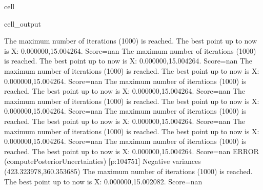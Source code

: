 \documentclass[letterpaper,10pt,english]{jupyterBook}
\begin{document}
\begin{sphinxuseclass}{cell}
\begin{sphinxVerbatimOutput}
\begin{sphinxuseclass}{cell_output}
\begin{sphinxVerbatim}[commandchars=\\\{\}]
The maximum number of iterations (1000) is reached. The best point up to now is X: \PYGZob{}0.000000,15.004264\PYGZcb{}. Score=\PYGZhy{}nan
The maximum number of iterations (1000) is reached. The best point up to now is X: \PYGZob{}0.000000,15.004264\PYGZcb{}. Score=\PYGZhy{}nan
The maximum number of iterations (1000) is reached. The best point up to now is X: \PYGZob{}0.000000,15.004264\PYGZcb{}. Score=\PYGZhy{}nan
The maximum number of iterations (1000) is reached. The best point up to now is X: \PYGZob{}0.000000,15.004264\PYGZcb{}. Score=\PYGZhy{}nan
The maximum number of iterations (1000) is reached. The best point up to now is X: \PYGZob{}0.000000,15.004264\PYGZcb{}. Score=\PYGZhy{}nan
The maximum number of iterations (1000) is reached. The best point up to now is X: \PYGZob{}0.000000,15.004264\PYGZcb{}. Score=\PYGZhy{}nan
The maximum number of iterations (1000) is reached. The best point up to now is X: \PYGZob{}0.000000,15.004264\PYGZcb{}. Score=\PYGZhy{}nan
The maximum number of iterations (1000) is reached. The best point up to now is X: \PYGZob{}0.000000,15.004264\PYGZcb{}. Score=\PYGZhy{}nan
ERROR (compute\PYGZus{}Posterior\PYGZus{}Uncertainties) [p:104751] Negative variances (\PYGZhy{}423.323978,360.353685)
The maximum number of iterations (1000) is reached. The best point up to now is X: \PYGZob{}0.000000,15.002082\PYGZcb{}. Score=\PYGZhy{}nan
\end{sphinxVerbatim}


\end{sphinxuseclass}
\end{sphinxVerbatimOutput}
\end{sphinxuseclass}
\end{document}
